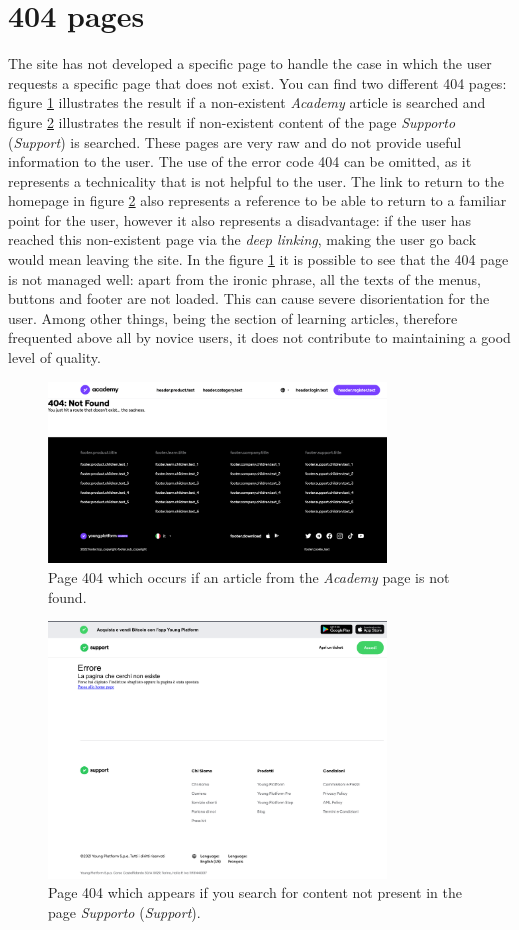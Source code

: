 \section{404 pages}

The site has not developed a specific page to handle the case in which the 
user requests a specific page that does not exist. You can find two 
different 404 pages: figure \ref{fig:404-academy} illustrates the result 
if a non-existent \textit{Academy} article is searched and figure 
\ref{fig:404-support} illustrates the result if non-existent content of the 
page \textit{Supporto} (\textit{Support}) is searched. These pages are very 
raw and do not provide useful information to the user. The use of the error 
code 404 can be omitted, as it represents a technicality that is not 
helpful to the user. The link to return to the homepage in figure 
\ref{fig:404-support} also represents a reference to be able to return to 
a familiar point for the user, however it also represents a disadvantage: 
if the user has reached this non-existent page via the 
\textit{deep linking}, making the user go back would mean leaving the 
site. In the figure \ref{fig:404-academy} it is possible to see that the 
404 page is not managed well: apart from the ironic phrase, all the texts 
of the menus, buttons and footer are not loaded. This can cause severe 
disorientation for the user. Among other things, being the section of 
learning articles, therefore frequented above all by novice users, it 
does not contribute to maintaining a good level of quality.

\begin{figure}[H]
  \centering
  \includegraphics[width=0.80\textwidth]{res/images/404-academy.png}
  \caption{Page 404 which occurs if an article from the \textit{Academy} 
  page is not found.}
  \label{fig:404-academy}
\end{figure}

\begin{figure}[H]
  \centering
  \includegraphics[width=0.80\textwidth]{res/images/404-support.png}
  \caption{Page 404 which appears if you search for content not present 
  in the page \textit{Supporto} (\textit{Support}).}
  \label{fig:404-support}
\end{figure}